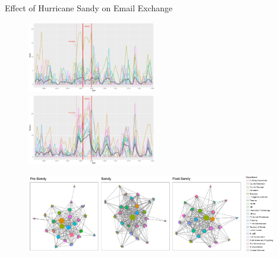 \documentclass[10pt]{beamer}
\theoremstyle{definition}
\theoremstyle{remark}
\begin{document}
\begin{frame}{Effect of Hurricane Sandy on Email Exchange}
	 	 \begin{figure}
	 	 	\includegraphics[width=0.5\textwidth]{figures/Sendplot.pdf}	 	
	 	 	\includegraphics[width=0.5\textwidth]{figures/Receiveplot.pdf}
	 	 \end{figure}	
	 \begin{figure}
	 		 	\includegraphics[width=0.85\textwidth]{figures/Networkplot.pdf}
	 		 	\hspace{0.1cm}
	 		 		 	\includegraphics[width=0.11\textwidth]{figures/Dept2.jpg}
	 \end{figure}	
\end{frame}
\end{document}
